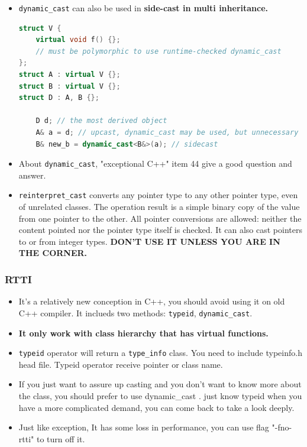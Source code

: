 \documentclass[a4paper,12pt,twoside]{book}
\begin{document}
\begin{itemize}
\item \texttt{dynamic\_cast} can also be used in \textbf{side-cast in multi inheritance. }
\begin{lstlisting}[frame=single, language=c++, mathescape=true]
struct V {
    virtual void f() {};
    // must be polymorphic to use runtime-checked dynamic_cast
};
struct A : virtual V {};
struct B : virtual V {};
struct D : A, B {};

    D d; // the most derived object
    A& a = d; // upcast, dynamic_cast may be used, but unnecessary
    B& new_b = dynamic_cast<B&>(a); // sidecast

\end{lstlisting}

\item About \texttt{dynamic\_cast}, "exceptional C++" item 44 give a good question and answer.

\item \texttt{reinterpret\_cast} converts any pointer type to any other pointer type, even of unrelated classes. The operation result is a simple binary copy of the value from one pointer to the other. All pointer conversions are allowed: neither the content pointed nor the pointer type itself is checked. It can also cast pointers to or from integer types. \textbf{DON'T USE IT UNLESS YOU ARE IN THE CORNER.}

\end{itemize}


\subsubsection{RTTI}
\begin{itemize}
\item It's a relatively new conception in C++, you should avoid using it on old C++ compiler. It inclueds two methods: \texttt{typeid}, \texttt{dynamic\_cast}.
\item \textbf{It only work with class hierarchy that has virtual functions. }

\item \texttt{typeid} operator will return a \texttt{type\_info} class.  You need to include typeinfo.h head file. Typeid operator receive pointer or class name.

\item If you just want to assure up casting and you don't want to know more about the class, you should prefer to use dynamic\_cast . just know typeid when you have a more complicated demand, you can come back to take a look deeply.

\item Just like exception, It has some loss in performance, you can use flag "-fno-rtti" to turn off it.
\end{itemize}
\end{document}
